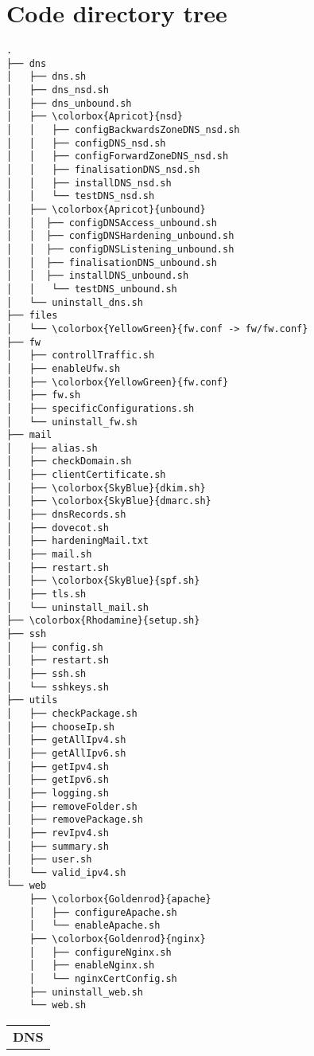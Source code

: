 \section{Code directory tree}
\begin{table}[H]
    \scriptsize
\begin{minipage}{.5\textwidth}
\begin{Verbatim}[fontsize=\tiny,commandchars=\\\{\}]
.
├── dns
│   ├── dns.sh
│   ├── dns_nsd.sh
│   ├── dns_unbound.sh
│   ├── \colorbox{Apricot}{nsd}
│   │   ├── configBackwardsZoneDNS_nsd.sh
│   │   ├── configDNS_nsd.sh
│   │   ├── configForwardZoneDNS_nsd.sh
│   │   ├── finalisationDNS_nsd.sh
│   │   ├── installDNS_nsd.sh
│   │   └── testDNS_nsd.sh
│   ├── \colorbox{Apricot}{unbound}
│   │  ├── configDNSAccess_unbound.sh
│   │  ├── configDNSHardening_unbound.sh
│   │  ├── configDNSListening_unbound.sh
│   │  ├── finalisationDNS_unbound.sh
│   │  ├── installDNS_unbound.sh
│   │   └── testDNS_unbound.sh
│   └── uninstall_dns.sh
├── files
│   └── \colorbox{YellowGreen}{fw.conf -> fw/fw.conf}
├── fw
│   ├── controllTraffic.sh
│   ├── enableUfw.sh
│   ├── \colorbox{YellowGreen}{fw.conf}
│   ├── fw.sh
│   ├── specificConfigurations.sh
│   └── uninstall_fw.sh
├── mail
│   ├── alias.sh
│   ├── checkDomain.sh
│   ├── clientCertificate.sh
│   ├── \colorbox{SkyBlue}{dkim.sh}
│   ├── \colorbox{SkyBlue}{dmarc.sh}
│   ├── dnsRecords.sh
│   ├── dovecot.sh
│   ├── hardeningMail.txt
│   ├── mail.sh
│   ├── restart.sh
│   ├── \colorbox{SkyBlue}{spf.sh}
│   ├── tls.sh
│   └── uninstall_mail.sh
├── \colorbox{Rhodamine}{setup.sh}
├── ssh
│   ├── config.sh
│   ├── restart.sh
│   ├── ssh.sh
│   └── sshkeys.sh
├── utils
│   ├── checkPackage.sh
│   ├── chooseIp.sh
│   ├── getAllIpv4.sh
│   ├── getAllIpv6.sh
│   ├── getIpv4.sh
│   ├── getIpv6.sh
│   ├── logging.sh
│   ├── removeFolder.sh
│   ├── removePackage.sh
│   ├── revIpv4.sh
│   ├── summary.sh
│   ├── user.sh
│   └── valid_ipv4.sh
└── web
    ├── \colorbox{Goldenrod}{apache}
    │   ├── configureApache.sh
    │   └── enableApache.sh
    ├── \colorbox{Goldenrod}{nginx}
    │   ├── configureNginx.sh
    │   ├── enableNginx.sh
    │   └── nginxCertConfig.sh
    ├── uninstall_web.sh
    └── web.sh
\end{Verbatim}
\end{minipage}
\begin{minipage}{.5\textwidth}
    \begin{tabularx}{\textwidth}{|X|}
        \hline
        \cellcolor{Apricot} \textbf{DNS} \\

\end{tabularx}
\end{minipage}
\end{table}

